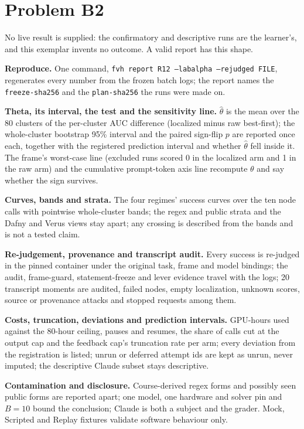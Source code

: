 \documentclass[11pt]{article}
\begin{document}
\section*{Problem B2}\label{ans:B2}
\begin{answer}
No live result is supplied: the confirmatory and descriptive runs are the
learner's, and this exemplar invents no outcome. A valid report has this shape.

\textbf{Reproduce.} One command, \texttt{fvh report R12 --labalpha --rejudged
FILE}, regenerates every number from the frozen batch logs; the report names the
\texttt{freeze-sha256} and the \texttt{plan-sha256} the runs were made on.

\textbf{Theta, its interval, the test and the sensitivity line.} $\hat\theta$ is
the mean over the 80 clusters of the per-cluster AUC difference (localized minus
raw best-first); the whole-cluster bootstrap 95\% interval and the paired
sign-flip $p$ are reported once each, together with the registered prediction
interval and whether $\hat\theta$ fell inside it. The frame's worst-case line
(excluded runs scored 0 in the localized arm and 1 in the raw arm) and the
cumulative prompt-token axis line recompute $\theta$ and say whether the sign
survives.

\textbf{Curves, bands and strata.} The four regimes' success curves over the ten
node calls with pointwise whole-cluster bands; the regex and public strata and the
Dafny and Verus views stay apart; any crossing is described from the bands and is
not a tested claim.

\textbf{Re-judgement, provenance and transcript audit.} Every success is re-judged
in the pinned container under the original task, frame and model bindings; the
audit, frame-guard, statement-freeze and lever evidence travel with the logs; 20
transcript moments are audited, failed nodes, empty localization, unknown scores,
source or provenance attacks and stopped requests among them.

\textbf{Costs, truncation, deviations and prediction intervals.} GPU-hours used
against the 80-hour ceiling, pauses and resumes, the share of calls cut at the
output cap and the feedback cap's truncation rate per arm; every deviation from the
registration is listed; unrun or deferred attempt ids are kept as unrun, never
imputed; the descriptive Claude subset stays descriptive.

\textbf{Contamination and disclosure.} Course-derived regex forms and possibly
seen public forms are reported apart; one model, one hardware and solver pin and
$B = 10$ bound the conclusion; Claude is both a subject and the grader.
Mock, Scripted and Replay fixtures validate software behaviour only.
\end{answer}
\end{document}
